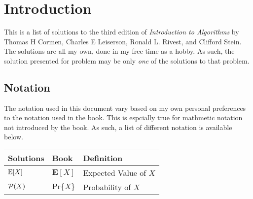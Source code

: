 \documentclass[../Algorithms]{subfiles}
\begin{document}
	\chapter*{Introduction}

	This is a list of solutions to the third edition of \textit{Introduction to Algorithms} by Thomas H Cormen, Charles E Leiserson, Ronald L. Rivest, and Clifford Stein. The solutions are all my own, done in my free time as a hobby. As such, the solution presented for problem may be only \textit{one} of the solutions to that problem.

	\section*{Notation}

	The notation used in this document vary based on my own personal preferences to the notation used in the book. This is espcially true for mathmetic notation not introduced by the book. As such, a list of different notation is available below.\\

	\begin{tabular}{l | l | l}
		\textbf{Solutions} & \textbf{Book} & \textbf{Definition}\\
		\hline
		$\mathbb{E}[X]$ & $\mathbf{E}[X]$ & Expected Value of $X$\\
		$\mathcal{P}(X)$ & $\mathrm{Pr}\{X\}$ & Probability of $X$
	\end{tabular}
\end{document}
